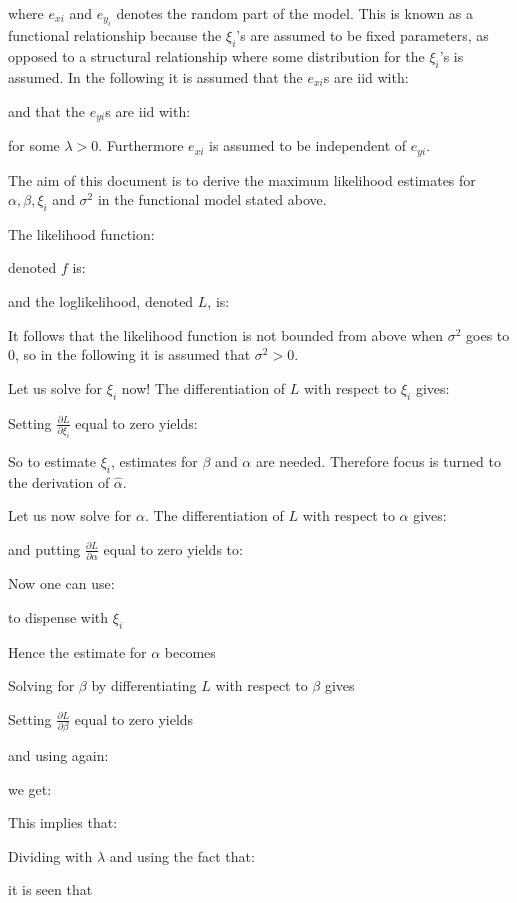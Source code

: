 	where $e_{xi}$ and $e_{y_i}$ denotes the random part of the model.
	This is known as a functional relationship because the $\xi_i$'s are
	assumed to be fixed parameters, as opposed to a structural
	relationship where some distribution for the $\xi_i$'s is assumed. In
	the following it is assumed that the $e_{xi}$s are iid with:
	
	and that the $e_{yi}$s are iid with:
	
	for some $\lambda>0$. Furthermore $e_{xi}$ is assumed to be independent of $e_{yi}$.
	
	The aim of this document is to derive the maximum
	likelihood estimates for $\alpha, \beta, \xi_i$ and $\sigma^2$ in the functional model stated above.

	The likelihood function:
	
	denoted $f$ is:
	
	and the loglikelihood, denoted $L$, is:
	
	It follows that the likelihood function is not bounded from above when $\sigma^2$ goes to $0$, so in the following it is assumed that $\sigma^2>0$.

	Let us solve for $\xi_i$ now! The differentiation of $L$ with respect to $\xi_i$ gives:
	
	Setting $\frac{\partial L}{\partial \xi_i}$ equal to zero yields:
	
	So to estimate $\xi_i$, estimates for $\beta$ and $\alpha$ are needed. Therefore focus is turned to the derivation of $\hat{\alpha}$.

	Let us now solve for $\alpha$. The differentiation of $L$ with respect to $\alpha$ gives:
	
	and putting $\frac{\partial L}{\partial \alpha}$ equal to zero yields to:
	
	Now one can use:
	
	to dispense with $\xi_i$
		
	
	Hence the estimate for $\alpha$ becomes
	

	Solving for $\beta$ by differentiating  $L$ with respect to $\beta$ gives
	
	Setting $\frac{\partial L}{\partial \beta}$ equal to zero yields
	
	and using again:
	
	we get:
	
	This implies that:
	
	Dividing with $\lambda$ and using the fact that:
	
	it is seen that
	
